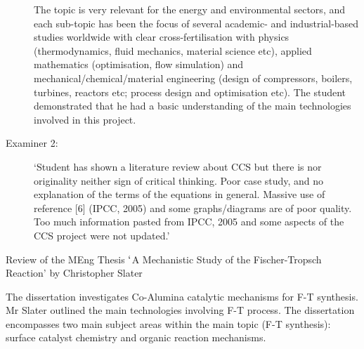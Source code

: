 \documentclass[14pt,twoside]{report}
\begin{document}
\begin{description}
The topic is very relevant for the energy and environmental sectors, and each sub-topic has been the focus of several academic- and industrial-based studies worldwide with clear cross-fertilisation with physics (thermodynamics, fluid mechanics, material science etc), applied mathematics (optimisation, flow simulation) and mechanical/chemical/material engineering (design of compressors, boilers, turbines, reactors etc; process design and optimisation etc). The student demonstrated that he had a basic understanding of the main technologies involved in this project.

\item[Examiner 2:] `Student has shown a literature review about CCS but there is nor originality neither sign of critical thinking. Poor case study, and no explanation of the terms of the equations in general. Massive use of reference [6] (IPCC, 2005) and some graphs/diagrams are of poor quality. Too much information pasted from IPCC, 2005 and some aspects of the CCS project were not updated.'

\end{description}

\clearpage



\bigskip

\begin{center}
  {\Large Review of the MEng Thesis $\lq$A Mechanistic Study of the Fischer-Tropsch Reaction' by Christopher Slater}
\end{center}

The dissertation investigates Co-Alumina catalytic mechanisms for F-T synthesis. Mr Slater outlined the main technologies involving F-T process. The dissertation encompasses two main subject areas within the main topic (F-T synthesis): surface catalyst chemistry and organic reaction mechanisms. 
\end{document}

